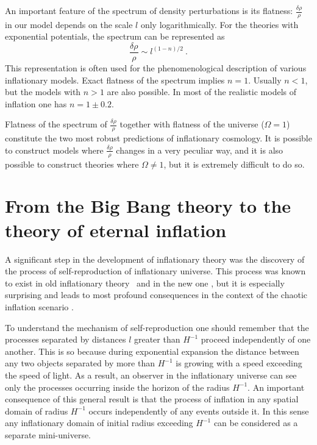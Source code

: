 \documentclass[a4paper,12pt]{article}
\begin{document}
An important feature of the spectrum of density perturbations is its
flatness: $\frac{\delta \rho}{\rho}$ in our model depends on the scale
$l$ only logarithmically. For the theories with exponential potentials, the spectrum can be represented as 
\begin{equation}\label{E26a}
\frac{\delta \rho}{\rho} \sim   l^{(1-n)/2}\ .
\end{equation}
This representation is often used for the phenomenological description of various inflationary models. Exact flatness of the spectrum implies $n = 1$.  Usually $n <1$, but the models with $n > 1$ are also possible. In most of the realistic models of inflation one has $n = 1\pm 0.2$.


Flatness of the spectrum of $\frac{\delta
\rho}{\rho}$ together with flatness of the universe ($\Omega = 1$)
constitute the two most robust predictions of inflationary cosmology. It
is possible to construct models where $\frac{\delta \rho}{\rho}$ changes
in a very peculiar way, and it is also possible to construct theories
where $\Omega \not = 1$, but it is extremely difficult to do so.


 

\section{From the Big Bang theory to the theory of eternal inflation}

A significant step in the development of inflationary theory was the discovery of the process of
self-reproduction of inflationary universe. This process was known to
exist in old inflationary theory~\cite{Guth} and in the new one
\cite{Et1,Et2,Et3}, but it is especially surprising and leads to most profound
consequences in the context of the chaotic inflation scenario
\cite{Eternal}. 


To understand the mechanism of self-reproduction one should remember that
the processes separated by distances $l$ greater than $H^{-1}$ proceed
independently of one another. This is so because during exponential
expansion the distance between any two objects separated by more than
$H^{-1}$ is growing with a speed exceeding the speed of light. As a
result, an observer in the inflationary universe can see only the
processes occurring inside the horizon of the radius  $H^{-1}$.
An important consequence of this general result is that the process of
inflation in any spatial domain of radius $H^{-1}$ occurs independently
of any events outside it. In this sense any inflationary domain of
initial radius exceeding $H^{-1}$ can be considered as a separate
mini-universe.
\end{document}
